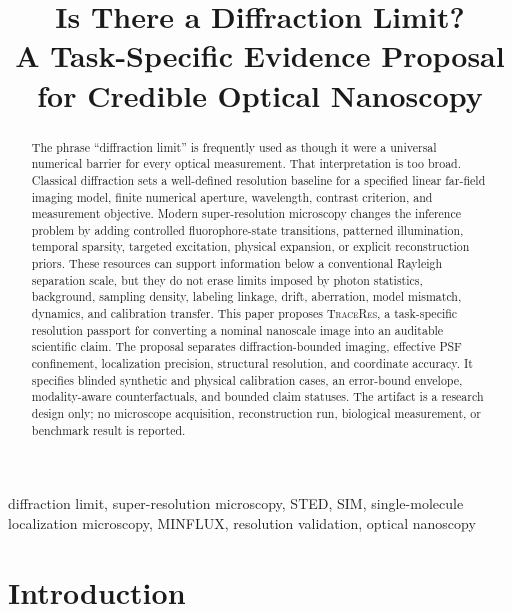 \documentclass[conference]{IEEEtran}
\newcommand{\traceres}{\textsc{TraceRes}}
\begin{document}
\title{Is There a Diffraction Limit?\\
A Task-Specific Evidence Proposal for Credible Optical Nanoscopy}

\author{
}

\maketitle

\begin{abstract}
The phrase ``diffraction limit'' is frequently used as though it were a universal numerical barrier for every optical measurement. That interpretation is too broad. Classical diffraction sets a well-defined resolution baseline for a specified linear far-field imaging model, finite numerical aperture, wavelength, contrast criterion, and measurement objective. Modern super-resolution microscopy changes the inference problem by adding controlled fluorophore-state transitions, patterned illumination, temporal sparsity, targeted excitation, physical expansion, or explicit reconstruction priors. These resources can support information below a conventional Rayleigh separation scale, but they do not erase limits imposed by photon statistics, background, sampling density, labeling linkage, drift, aberration, model mismatch, dynamics, and calibration transfer. This paper proposes \traceres{}, a task-specific resolution passport for converting a nominal nanoscale image into an auditable scientific claim. The proposal separates diffraction-bounded imaging, effective PSF confinement, localization precision, structural resolution, and coordinate accuracy. It specifies blinded synthetic and physical calibration cases, an error-bound envelope, modality-aware counterfactuals, and bounded claim statuses. The artifact is a research design only; no microscope acquisition, reconstruction run, biological measurement, or benchmark result is reported.
\end{abstract}

\begin{IEEEkeywords}
diffraction limit, super-resolution microscopy, STED, SIM, single-molecule localization microscopy, MINFLUX, resolution validation, optical nanoscopy
\end{IEEEkeywords}

\section{Introduction}
\end{document}

